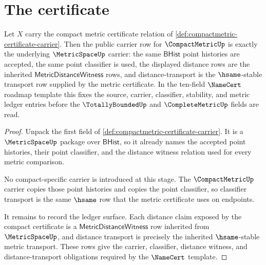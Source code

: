 \section{The certificate}
\label{sec:compactmetric-certificate}

\begin{theorem}
\label{thm:compactmetric-metric-carrier-obligation}
Let $X$ carry the compact metric certificate relation of
\autoref{def:compactmetric-certificate-carrier}. Then the public carrier row
for $\CompactMetricUp$ is exactly the underlying $\MetricSpaceUp$ carrier:
the same $\mathsf{BHist}$ point histories are accepted, the same point
classifier is used, the displayed distance rows are the inherited
$\mathsf{MetricDistanceWitness}$ rows, and distance-transport is the
$\hsame$-stable transport row supplied by the metric certificate. In the
ten-field $\NameCert$ roadmap template this fixes the source, carrier,
classifier, stability, and metric ledger entries before the
$\TotallyBoundedUp$ and $\CompleteMetricUp$ fields are read.
\end{theorem}
\begin{proof}
Unpack the first field of
\autoref{def:compactmetric-certificate-carrier}. It is a
$\MetricSpaceUp$ package over $\mathsf{BHist}$, so it already names the
accepted point histories, their point classifier, and the distance witness
relation used for every metric comparison.

No compact-specific carrier is introduced at this stage. The
$\CompactMetricUp$ carrier copies those point histories and copies the point
classifier, so classifier transport is the same $\hsame$ row that the metric
certificate uses on endpoints.

It remains to record the ledger surface. Each distance claim exposed by the
compact certificate is a $\mathsf{MetricDistanceWitness}$ row inherited from
$\MetricSpaceUp$, and distance transport is precisely the inherited
$\hsame$-stable metric transport. These rows give the carrier, classifier,
distance witness, and distance-transport obligations required by the
$\NameCert$ template.
\end{proof}

